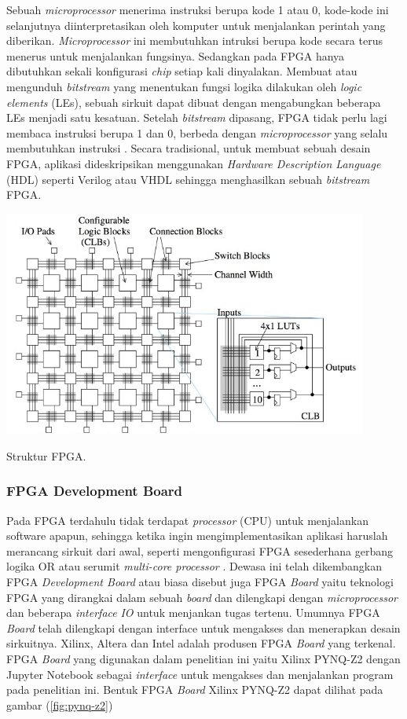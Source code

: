 Sebuah \textit{microprocessor} menerima instruksi berupa kode 1 atau 0, kode-kode ini selanjutnya diinterpretasikan oleh komputer untuk menjalankan perintah yang diberikan. \textit{Microprocessor} ini membutuhkan intruksi berupa kode secara terus menerus untuk menjalankan fungsinya. Sedangkan pada FPGA hanya dibutuhkan sekali konfigurasi \textit{chip} setiap kali dinyalakan. Membuat atau mengunduh \textit{bitstream} yang menentukan fungsi logika dilakukan oleh \textit{logic elements} (LEs), sebuah sirkuit dapat dibuat dengan mengabungkan beberapa LEs menjadi satu kesatuan. Setelah \textit{bitstream} dipasang, FPGA tidak perlu lagi membaca instruksi berupa 1 dan 0, berbeda dengan \textit{microprocessor} yang selalu membutuhkan instruksi \cite{pdf:cheung}. Secara tradisional, untuk membuat sebuah desain FPGA, aplikasi dideskripsikan menggunakan \textit{Hardware Description Language} (HDL) seperti Verilog atau VHDL sehingga menghasilkan sebuah \textit{bitstream} FPGA. 

\begin{afigure}
    \includegraphics[width=12cm, center]{images/fpga-structure.jpeg}
    \caption{Struktur FPGA.}
    \label{fig:fpga-structure}
\end{afigure}

\subsubsection{FPGA Development Board}
Pada FPGA terdahulu tidak terdapat \textit{processor} (CPU) untuk menjalankan software apapun, sehingga ketika ingin mengimplementasikan aplikasi haruslah merancang sirkuit dari awal, seperti mengonfigurasi FPGA sesederhana gerbang logika OR atau serumit \textit{multi-core processor} \cite{site:biswas}. Dewasa ini telah dikembangkan FPGA \textit{Development Board} atau biasa disebut juga FPGA \textit{Board} yaitu teknologi FPGA yang dirangkai dalam sebuah \textit{board} dan dilengkapi dengan \textit{microprocessor} dan beberapa \textit{interface} \textit{IO} untuk menjankan tugas tertenu. Umumnya FPGA \textit{Board} telah dilengkapi dengan interface untuk mengakses dan menerapkan desain sirkuitnya. Xilinx, Altera dan Intel adalah produsen FPGA \textit{Board} yang terkenal. FPGA \textit{Board} yang digunakan dalam penelitian ini yaitu Xilinx PYNQ-Z2 dengan Jupyter Notebook sebagai \textit{interface} untuk mengakses dan menjalankan program pada penelitian ini. Bentuk FPGA \textit{Board} Xilinx PYNQ-Z2 dapat dilihat pada gambar (\ref{fig:pynq-z2})

